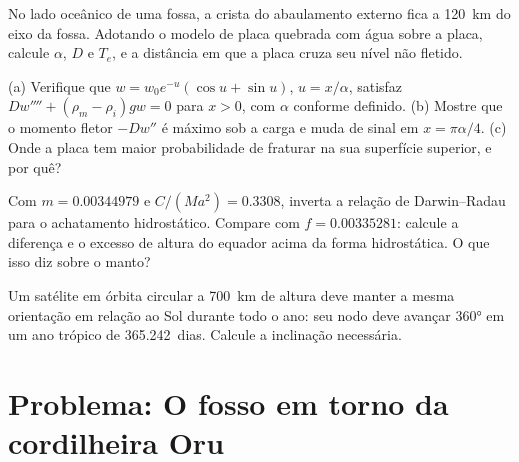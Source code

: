 \begin{exercise}[$\star\star$]\label{exo:b3:gravity-geodesy:9}
No lado oceânico de uma fossa, a crista do abaulamento externo fica a \qty{120}{km} do
eixo da fossa. Adotando o modelo de placa quebrada com água sobre a placa, calcule
$\alpha$, $D$ e $T_e$, e a distância em que a placa cruza seu nível não
fletido.
\end{exercise}

\begin{exercise}[$\star\star\star$]\label{exo:b3:gravity-geodesy:10}
(a) Verifique que $w = w_0e^{-u}(\cos u + \sin u)$, $u = x/\alpha$, satisfaz
$Dw'''' + (\rho_m - \rho_i)gw = 0$ para $x > 0$, com $\alpha$ conforme definido.
(b) Mostre que o momento fletor $-Dw''$ é máximo sob a carga e muda
de sinal em $x = \pi\alpha/4$. (c) Onde a placa tem maior probabilidade de fraturar
na sua superfície superior, e por quê?
\end{exercise}

\begin{exercise}[$\star\star\star$]\label{exo:b3:gravity-geodesy:11}
Com $m = \num{0.00344979}$ e $C/(Ma^2) = \num{0.3308}$, inverta a
relação de Darwin--Radau para o achatamento hidrostático. Compare com
$f = \num{0.00335281}$: calcule a diferença e o excesso de altura do
equador acima da forma hidrostática. O que isso diz sobre o manto?
\end{exercise}

\begin{exercise}[$\star\star\star$]\label{exo:b3:gravity-geodesy:12}
Um satélite em órbita circular a \qty{700}{km} de altura deve manter a mesma
orientação em relação ao Sol durante todo o ano: seu nodo deve avançar \ang{360} em
um ano trópico de \num{365.242}~dias. Calcule a inclinação necessária.
\end{exercise}

\section{Problema: O fosso em torno da cordilheira Oru}

